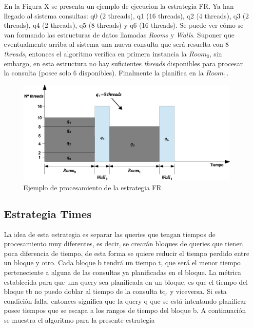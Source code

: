 En la Figura X se presenta un ejemplo de ejecucion la estrategia FR. Ya han llegado al sistema consultas: q0 (2 threads), q1 (16 threads), q2 (4 threads), q3 (2 threads), q4 (2 threads), q5 (8 threads) y q6 (16 threads). Se puede ver cómo se van formando las estructuras de datos llamadas \textit{Rooms} y \textit{Walls}. Suponer que eventualmente arriba al sistema una nueva consulta que será resuelta con 8 \textit{threads}, entonces el algoritmo verifica en primera instancia la $Room_0$, sin embargo, en esta estructura no hay suficientes \textit{threads} disponibles para procesar la consulta (posee solo 6 disponibles). Finalmente la planifica en la $Room_1$.

\begin{figure}[!th]
\centering
\includegraphics[scale=.75]{images/proceso_FR.eps}
\caption{Ejemplo de procesamiento de la estrategia FR}
\label{fig:proceso_FR}
\end{figure} 


\subsection{Estrategia Times}
\label{scheduling:times}
La idea de esta estrategia es separar las queries que tengan tiempos de procesamiento muy diferentes, es decir, se crearán bloques de queries que tienen poca diferencia de tiempo, de esta forma se quiere reducir el tiempo perdido entre un bloque y otro. Cada bloque b tendrá un tiempo t, que será el menor tiempo perteneciente a alguna de las consultas ya planificadas en el bloque. La métrica establecida para que una query sea planificada en un bloque, es que el tiempo del bloque tb no puedo doblar al tiempo de la consulta tq, y viceversa. Si esta condición falla, entonces significa que la query q que se está intentando planificar posee tiempos que se escapa a los rangos de tiempo del bloque b. A continuación se muestra el algoritmo para la presente estrategia

